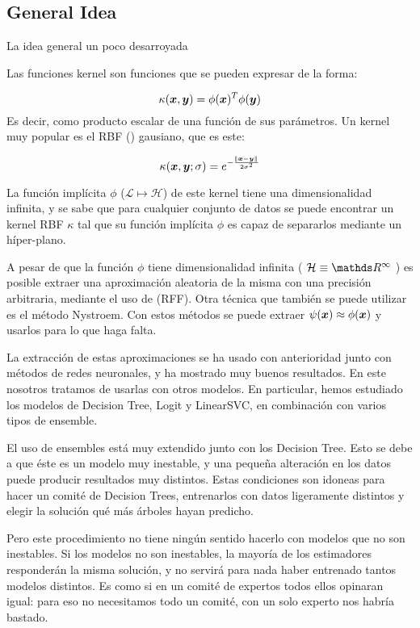\subsection{General Idea}
  La idea general un poco desarroyada

  Las funciones kernel son funciones que se pueden expresar de la forma:

  \begin{equation}
     \kappa(\bm{x}, \bm{y}) = \phi(\bm{x})^T\phi(\bm{y})
  \end{equation}
  Es decir, como producto escalar de una función de sus parámetros. Un kernel muy
  popular es el RBF () gausiano, que es este:

  \begin{equation}
   \kappa({\bm{x}, \bm{y}}; \sigma) = e^{-\frac{\norm{\bm{x} - \bm{y}}}{2\sigma^2}}
  \end{equation}

  La función implícita $\phi$ ($\mathcal{L} \mapsto \mathcal{H}$) de este kernel
  tiene una dimensionalidad infinita, y se sabe que para cualquier conjunto de
  datos se puede encontrar un kernel RBF $\kappa$ tal que su función implícita
  $\phi$ es capaz de separarlos mediante un híper-plano.

  A pesar de que la función $\phi$ tiene dimensionalidad infinita (
  $\mathcal{H} \equiv \reals^\infty$
  ) es posible extraer una aproximación aleatoria de la misma con una precisión arbitraria,
  mediante el uso de  \cite{rff} (RFF). Otra técnica
  que también se puede utilizar es el método Nystroem. Con estos
  métodos se puede extraer $\psi(\bm{x}) \approx \phi(\bm{x})$ y usarlos para lo que
  haga falta.

  La extracción de estas aproximaciones se ha usado con anterioridad junto con
  métodos de redes neuronales, y ha mostrado muy buenos resultados. En este
  nosotros tratamos de usarlas con otros modelos. En particular, hemos
  estudiado los modelos de Decision Tree, Logit y LinearSVC, en combinación con
  varios tipos de ensemble.

  El uso de ensembles está muy extendido junto con los Decision Tree. Esto se
  debe a que éste es un modelo muy inestable, y una pequeña alteración en los
  datos puede producir resultados muy distintos. Estas condiciones son idoneas
  para hacer un comité de Decision Trees, entrenarlos con datos ligeramente
  distintos y elegir la solución qué más árboles hayan predicho.

  Pero este procedimiento no tiene ningún sentido hacerlo con modelos que no son
  inestables. Si los modelos no son inestables, la mayoría de los estimadores
  responderán la misma solución, y no servirá para nada haber entrenado tantos
  modelos distintos. Es como si en un comité de expertos todos ellos opinaran
  igual: para eso no necesitamos todo un comité, con un solo experto nos habría
  bastado.

